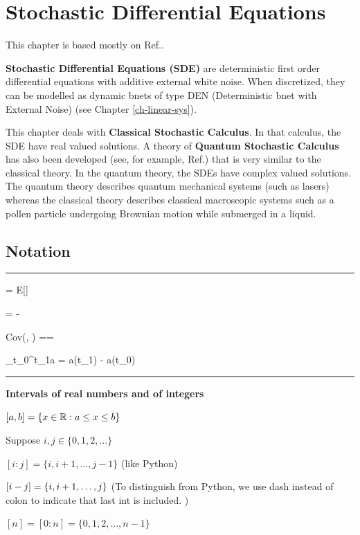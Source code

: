 \chapter{Stochastic Differential Equations}
\label{ch-stochastic-diff-eqns}

This chapter is based mostly on Ref.\cite{sar-sol}.

{\bf Stochastic Differential Equations (SDE)}
are deterministic first order differential equations with additive external white noise. When discretized, they 
can be modelled as dynamic bnets of type
DEN (Deterministic bnet with External Noise) (see Chapter \ref{ch-linear-sys}).

This chapter deals with {\bf Classical Stochastic Calculus}. In that calculus,
the SDE have real valued solutions.
A theory of {\bf Quantum Stochastic Calculus} has also been developed (see,
for example,  Ref.\cite{part-quantum-sde}) that is
very similar to the classical
theory. In the quantum theory, the SDEs  have complex valued solutions. The quantum theory describes quantum 
mechanical systems (such as lasers) 
whereas the classical theory describes classical macroscopic systems such as a
pollen particle undergoing Brownian motion
while submerged in a liquid.


\section{Notation}

\hrule{}

\beq 
\av{\rva} = E[\rva]
\eeq

\beq
\Delta \rva = \rva - \av{\rva}
\eeq

\beq
Cov(\rva, \rvb) =\av{\rva, \rvb}=
\av{\Delta\rva \Delta\rvb}
\eeq

\beq
\Delta_{t_0}^{t_1}a = a(t_1) - a(t_0)
\eeq

\hrule \noindent
{\bf Intervals of real numbers and of integers}

$[a, b]=\{ x\in { \mathbb{R}}: a\leq x \leq b\}$

Suppose $i, j\in \{0, 1,2, \ldots\}$

$[i:j] =\{i, i+1, \ldots, j-1\}$  (like Python)

$[i - j] = \{i, i+1, \ldots, j\}$ (To distinguish from Python,
we use dash instead of colon 
to indicate that last int is included.
)




$[n]=[0:n]=\{0, 1, 2, \ldots, n-1\}$


